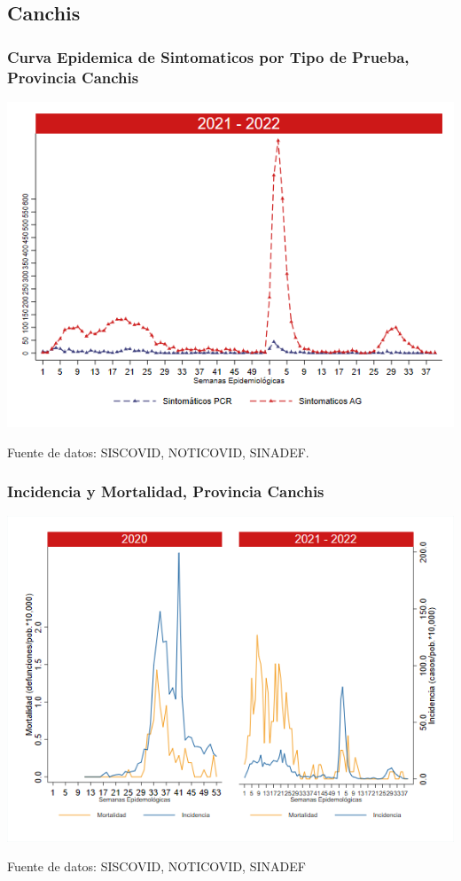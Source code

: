 \documentclass[xcolor=table]{beamer}
\begin{document}
\subsection{Canchis}
\begin{frame}[label=Canchis]
	\frametitle{Curva Epidemica de Sintomaticos por Tipo de Prueba, Provincia Canchis}
	\vspace{-.5cm}
	\begin{center}
		\includegraphics[width=0.8\linewidth, trim={0cm .5cm 0cm 0.2cm},clip]{../figuras/sinto_prueba20_21_5.png}
	\end{center}
	{\tiny Fuente de datos: SISCOVID, NOTICOVID, SINADEF.}
	\hyperlink{TipoPrueba}{}
\end{frame}

\begin{frame}[label=Canchis]
	\frametitle{Incidencia y Mortalidad, Provincia Canchis}
	\vspace{-.5cm}
	\begin{center}
		\includegraphics[width=0.8\linewidth, trim={0cm .5cm 0cm 0.2cm},clip]{../figuras/incidencia_mortalidad_20_21_5.png}
	\end{center}
	{\tiny Fuente de datos: SISCOVID, NOTICOVID, SINADEF}
\end{frame}
\end{document}
